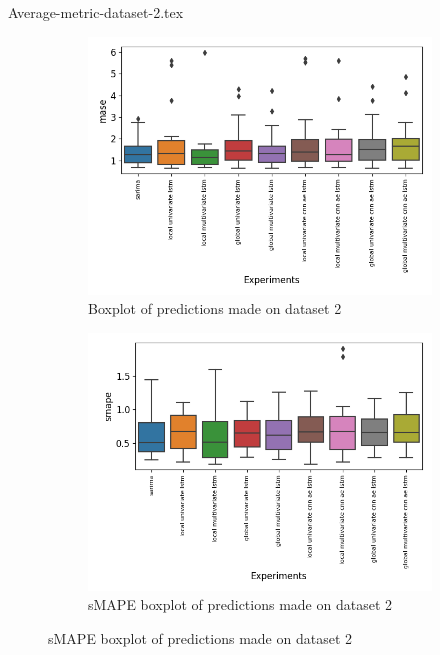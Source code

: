 \begin{samepage}
  {Average-metric-dataset-2.tex}
  \begin{figure}[ht!]
    \centering
    \begin{subfigure}[b]{0.49\textwidth}
      \includegraphics[width=\textwidth]{./figs/results/boxplot/mase-dataset_2.png}
      \hfill
      \caption{Boxplot of predictions made on dataset 2}
      \label{fig:results:boxplot-mase-dataset-2-mase}
    \end{subfigure}
    \begin{subfigure}[b]{0.49\textwidth}
      \includegraphics[width=\textwidth]{./figs/results/boxplot/smape-dataset_2.png}
      \hfill
      \caption{sMAPE boxplot of predictions made on dataset 2}
      \label{fig:results:boxplot-mase-dataset-2-smape}
    \end{subfigure}
  \end{figure}
\end{samepage}

